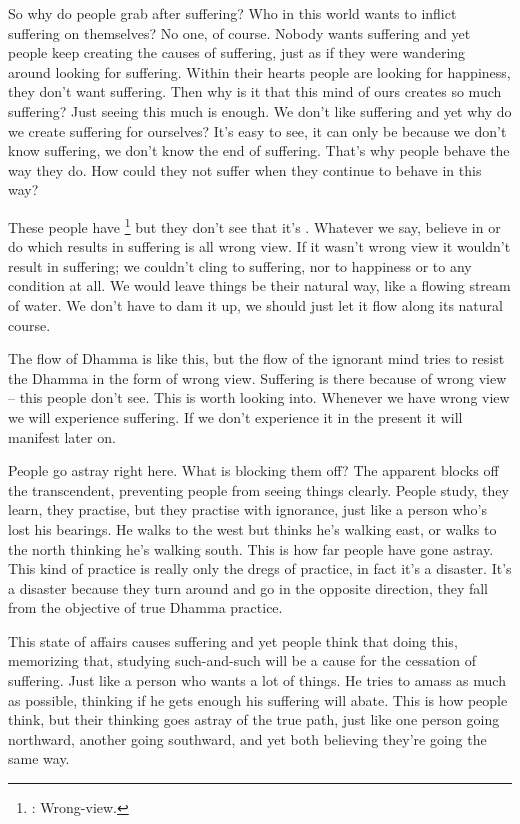So why do people grab after suffering? Who in this world wants to inflict suffering on themselves? No one, of course. Nobody wants suffering and yet people keep creating the causes of suffering, just as if they were wandering around looking for suffering. Within their hearts people are looking for happiness, they don't want suffering. Then why is it that this mind of ours creates so much suffering? Just seeing this much is enough. We don't like suffering and yet why do we create suffering for ourselves? It's easy to see, it can only be because we don't know suffering, we don't know the end of suffering. That's why people behave the way they do. How could they not suffer when they continue to behave in this way?

These people have \footnote{: Wrong-view.} but they don't see that it's . Whatever we say, believe in or do which results in suffering is all wrong view. If it wasn't wrong view it wouldn't result in suffering; we couldn't cling to suffering, nor to happiness or to any condition at all. We would leave things be their natural way, like a flowing stream of water. We don't have to dam it up, we should just let it flow along its natural course.

The flow of Dhamma is like this, but the flow of the ignorant mind tries to resist the Dhamma in the form of wrong view. Suffering is there because of wrong view -- this people don't see. This is worth looking into. Whenever we have wrong view we will experience suffering. If we don't experience it in the present it will manifest later on.

People go astray right here. What is blocking them off? The apparent blocks off the transcendent, preventing people from seeing things clearly. People study, they learn, they practise, but they practise with ignorance, just like a person who's lost his bearings. He walks to the west but thinks he's walking east, or walks to the north thinking he's walking south. This is how far people have gone astray. This kind of practice is really only the dregs of practice, in fact it's a disaster. It's a disaster because they turn around and go in the opposite direction, they fall from the objective of true Dhamma practice.

This state of affairs causes suffering and yet people think that doing this, memorizing that, studying such-and-such will be a cause for the cessation of suffering. Just like a person who wants a lot of things. He tries to amass as much as possible, thinking if he gets enough his suffering will abate. This is how people think, but their thinking goes astray of the true path, just like one person going northward, another going southward, and yet both believing they're going the same way.

